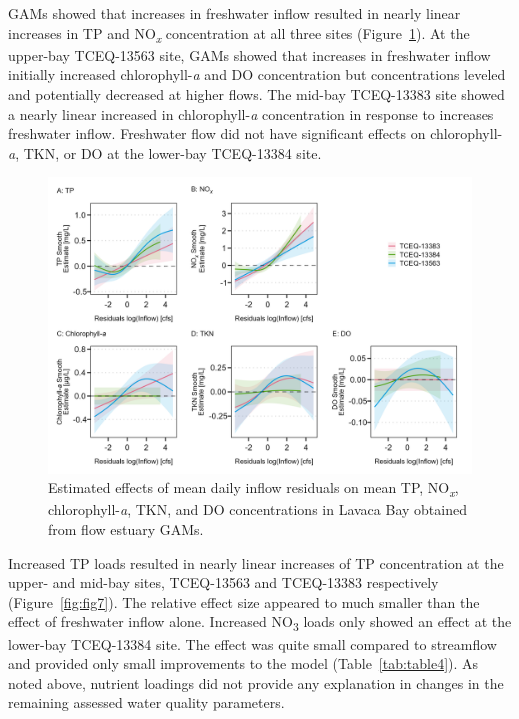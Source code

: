 \documentclass[sn-basic,referee,lineno,pdflatex]{sn-jnl}
\begin{document}
GAMs showed that increases in freshwater inflow resulted in nearly
linear increases in TP and NO\textsubscript{\emph{x}} concentration at
all three sites (Figure~\ref{fig:fig6}). At the upper-bay TCEQ-13563
site, GAMs showed that increases in freshwater inflow initially
increased chlorophyll-\emph{a} and DO concentration but concentrations
leveled and potentially decreased at higher flows. The mid-bay
TCEQ-13383 site showed a nearly linear increased in chlorophyll-\emph{a}
concentration in response to increases freshwater inflow. Freshwater
flow did not have significant effects on chlorophyll-\emph{a}, TKN, or
DO at the lower-bay TCEQ-13384 site.

\begin{figure}

{\centering \includegraphics[width=1\linewidth,]{Schramm-2023-05-AS_files/figure-latex/fig6-1} 

}

\caption{Estimated effects of mean daily inflow residuals on mean TP, NO\textsubscript{\textit{x}}, chlorophyll-\textit{a}, TKN, and DO concentrations in Lavaca Bay obtained from flow estuary GAMs.}\label{fig:fig6}
\end{figure}

Increased TP loads resulted in nearly linear increases of TP
concentration at the upper- and mid-bay sites, TCEQ-13563 and TCEQ-13383
respectively (Figure~\ref{fig:fig7}). The relative effect size appeared
to much smaller than the effect of freshwater inflow alone. Increased
NO\textsubscript{3} loads only showed an effect at the lower-bay
TCEQ-13384 site. The effect was quite small compared to streamflow and
provided only small improvements to the model (Table~\ref{tab:table4}).
As noted above, nutrient loadings did not provide any explanation in
changes in the remaining assessed water quality parameters.
\end{document}
